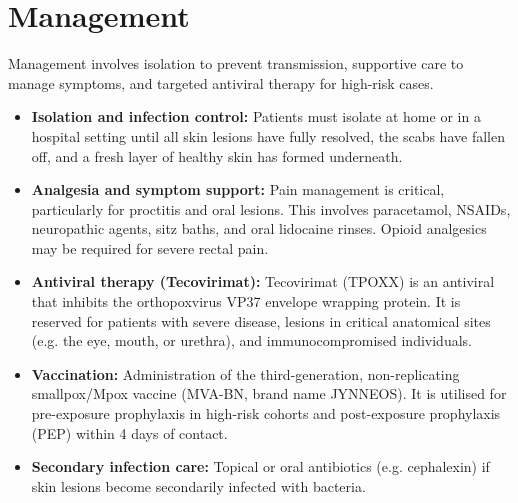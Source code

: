 \section*{Management}
Management involves isolation to prevent transmission, supportive care to manage symptoms, and targeted antiviral therapy for high-risk cases.
\begin{itemize}
    \item \textbf{Isolation and infection control:} Patients must isolate at home or in a hospital setting until all skin lesions have fully resolved, the scabs have fallen off, and a fresh layer of healthy skin has formed underneath.
    \item \textbf{Analgesia and symptom support:} Pain management is critical, particularly for proctitis and oral lesions. This involves paracetamol, NSAIDs, neuropathic agents, sitz baths, and oral lidocaine rinses. Opioid analgesics may be required for severe rectal pain.
    \item \textbf{Antiviral therapy (Tecovirimat):} Tecovirimat (TPOXX) is an antiviral that inhibits the orthopoxvirus VP37 envelope wrapping protein. It is reserved for patients with severe disease, lesions in critical anatomical sites (e.g. the eye, mouth, or urethra), and immunocompromised individuals.
    \item \textbf{Vaccination:} Administration of the third-generation, non-replicating smallpox/Mpox vaccine (MVA-BN, brand name JYNNEOS). It is utilised for pre-exposure prophylaxis in high-risk cohorts and post-exposure prophylaxis (PEP) within 4 days of contact.
    \item \textbf{Secondary infection care:} Topical or oral antibiotics (e.g. cephalexin) if skin lesions become secondarily infected with bacteria.
\end{itemize}

